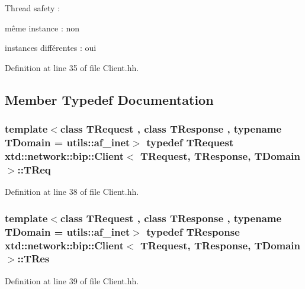 Thread safety \-:
\begin{DoxyItemize}
\item même instance \-: non
\item instances différentes \-: oui 
\end{DoxyItemize}

Definition at line 35 of file Client.\-hh.



\subsection{Member Typedef Documentation}
\hypertarget{classxtd_1_1network_1_1bip_1_1Client_a4fd207d42e4738c5aa2f6ca947067be4}{
\subsubsection[{T\-Req}]{\setlength{\rightskip}{0pt plus 5cm}template$<$class T\-Request , class T\-Response , typename T\-Domain  = utils\-::af\-\_\-inet$>$ typedef T\-Request {\bf xtd\-::network\-::bip\-::\-Client}$<$ T\-Request, T\-Response, T\-Domain $>$\-::{\bf T\-Req}}}\label{classxtd_1_1network_1_1bip_1_1Client_a4fd207d42e4738c5aa2f6ca947067be4}


Definition at line 38 of file Client.\-hh.

\hypertarget{classxtd_1_1network_1_1bip_1_1Client_a1fc57254a811008a795987c49c222e77}{
\subsubsection[{T\-Res}]{\setlength{\rightskip}{0pt plus 5cm}template$<$class T\-Request , class T\-Response , typename T\-Domain  = utils\-::af\-\_\-inet$>$ typedef T\-Response {\bf xtd\-::network\-::bip\-::\-Client}$<$ T\-Request, T\-Response, T\-Domain $>$\-::{\bf T\-Res}}}\label{classxtd_1_1network_1_1bip_1_1Client_a1fc57254a811008a795987c49c222e77}


Definition at line 39 of file Client.\-hh.



